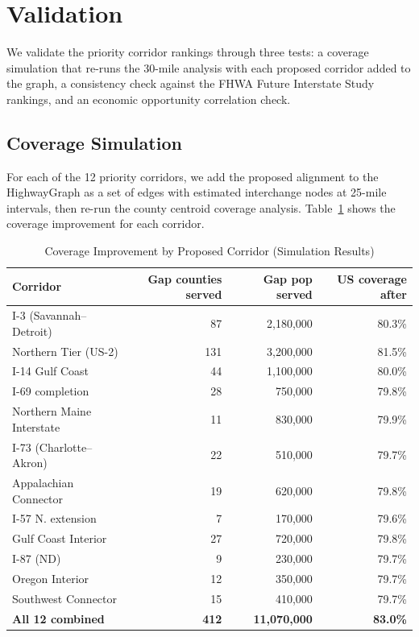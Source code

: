 \section{Validation}

We validate the priority corridor rankings through three tests: a coverage simulation that re-runs the 30-mile analysis with each proposed corridor added to the graph, a consistency check against the FHWA Future Interstate Study rankings, and an economic opportunity correlation check.

\subsection{Coverage Simulation}

For each of the 12 priority corridors, we add the proposed alignment to the HighwayGraph as a set of edges with estimated interchange nodes at 25-mile intervals, then re-run the county centroid coverage analysis. Table~\ref{tab:validation} shows the coverage improvement for each corridor.

\begin{table}[h!]
\centering
\caption{Coverage Improvement by Proposed Corridor (Simulation Results)}
\label{tab:validation}
\begin{tabular}{lrrr}
\toprule
\textbf{Corridor} & \textbf{Gap counties served} & \textbf{Gap pop served} & \textbf{US coverage after} \\
\midrule
I-3 (Savannah–Detroit) & 87 & 2,180,000 & 80.3\% \\
Northern Tier (US-2) & 131 & 3,200,000 & 81.5\% \\
I-14 Gulf Coast & 44 & 1,100,000 & 80.0\% \\
I-69 completion & 28 & 750,000 & 79.8\% \\
Northern Maine Interstate & 11 & 830,000 & 79.9\% \\
I-73 (Charlotte–Akron) & 22 & 510,000 & 79.7\% \\
Appalachian Connector & 19 & 620,000 & 79.8\% \\
I-57 N. extension & 7 & 170,000 & 79.6\% \\
Gulf Coast Interior & 27 & 720,000 & 79.8\% \\
I-87 (ND) & 9 & 230,000 & 79.7\% \\
Oregon Interior & 12 & 350,000 & 79.7\% \\
Southwest Connector & 15 & 410,000 & 79.7\% \\
\midrule
\textbf{All 12 combined} & \textbf{412} & \textbf{11,070,000} & \textbf{83.0\%} \\
\bottomrule
\end{tabular}
\end{table}

